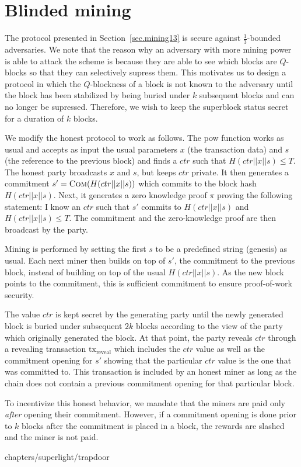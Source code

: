 \section{Blinded mining}

The protocol presented in Section~\ref{sec.mining13} is secure against
$\frac{1}{3}$-bounded adversaries. We note that the reason why an adversary with more
mining power is able to attack the scheme is because they are able to see which
blocks are $Q$-blocks so that they can selectively supress them. This motivates
us to design a protocol in which the $Q$-blockness of a block is not known to
the adversary until the block has been stabilized by being buried under $k$
subsequent blocks and can no longer be supressed. Therefore, we wish to keep
the superblock status secret for a duration of $k$ blocks.

We modify the honest protocol to work as follows. The \textsf{pow} function
works as usual and accepts as input the usual parameters $x$ (the transaction
data) and $s$ (the reference to the previous block) and finds a $ctr$ such that
$H(ctr || x || s) \leq T$. The honest party broadcasts $x$ and $s$, but keeps
$ctr$ private. It then generates a commitment $s' = \textsc{Com}(H(ctr || x ||
s))$ which commits to the block hash $H(ctr || x || s)$. Next, it generates a
zero knowledge proof $\pi$ proving the following statement: I know an $ctr$ such
that $s'$ commits to $H(ctr || x || s)$  and $H(ctr || x || s) \leq T$. The
commitment and the zero-knowledge proof are then broadcast by the party.

Mining is performed by setting the first $s$ to be a predefined string (genesis)
as usual. Each next miner then builds on top of $s'$, the commitment to the
previous block, instead of building on top of the usual $H(ctr || x || s)$. As
the new block points to the commitment, this is sufficient commitment to ensure
proof-of-work security.

The value $ctr$ is kept secret by the generating party until the newly generated
block is buried under subsequent $2k$ blocks according to the view of the party
which originally generated the block. At that point, the party reveals $ctr$
through a revealing transaction $\text{tx}_\text{reveal}$ which includes the
$ctr$ value as well as the commitment opening for $s'$ showing that the
particular $ctr$ value is the one that was committed to. This transaction is
included by an honest miner as long as the chain does not contain a previous
commitment opening for that particular block.

To incentivize this honest behavior, we mandate that the miners are paid only
\emph{after} opening their commitment. However, if a commitment opening is done
prior to $k$ blocks after the commitment is placed in a block, the rewards are
slashed and the miner is not paid.

{chapters/superlight/trapdoor}
